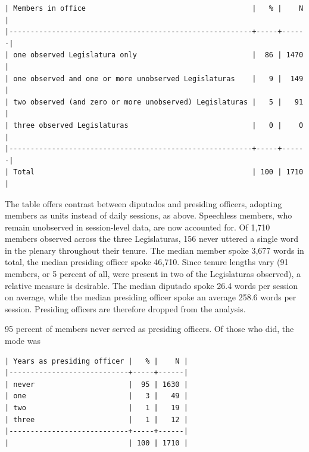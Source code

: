 \documentclass[letter,12pt]{article}
\begin{document}
\singlespacing
\begin{footnotesize}
\begin{verbatim}
| Members in office                                       |   % |    N |
|---------------------------------------------------------+-----+------|
| one observed Legislatura only                           |  86 | 1470 |
| one observed and one or more unobserved Legislaturas    |   9 |  149 |
| two observed (and zero or more unobserved) Legislaturas |   5 |   91 |
| three observed Legislaturas                             |   0 |    0 |
|---------------------------------------------------------+-----+------|
| Total                                                   | 100 | 1710 |
\end{verbatim}
\end{footnotesize}
\doublespacing

The table offers contrast between diputados and presiding officers, adopting members as units instead of daily sessions, as above. Speechless members, who remain unobserved in session-level data, are now accounted for. Of 1,710 members observed across the three Legislaturas, 156 never uttered a single word in the plenary throughout their tenure. The median member spoke 3,677 words in total, the median presiding officer spoke 46,710. Since tenure lengths vary (91 members, or 5 percent of all, were present in two of the Legislaturas observed), a relative measure is desirable. The median diputado spoke 26.4 words per session on average, while the median presiding officer spoke an average 258.6 words per session. Presiding officers are therefore dropped from the analysis. 

95 percent of members never served as presiding officers. Of those who did, the mode was 

\singlespacing
\begin{footnotesize}
\begin{verbatim}
| Years as presiding officer |   % |    N |
|----------------------------+-----+------|
| never                      |  95 | 1630 |
| one                        |   3 |   49 |
| two                        |   1 |   19 |
| three                      |   1 |   12 |
|----------------------------+-----+------|
|                            | 100 | 1710 |
\end{verbatim}
\end{footnotesize}
\doublespacing
\end{document}
